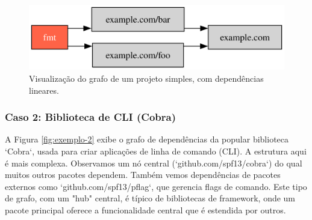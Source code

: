 \documentclass[12pt]{article}
\begin{document}
\begin{figure}[htbp]
\centering
\includegraphics[width=.8\textwidth]{examples/example.com.png}
\caption{Visualização do grafo de um projeto simples, com dependências lineares.}
\label{fig:grafoExemplo}
\end{figure}

\FloatBarrier

\subsubsection{Caso 2: Biblioteca de CLI (Cobra)}
A Figura \ref{fig:exemplo-2} exibe o grafo de dependências da popular biblioteca `Cobra`, usada para criar aplicações de linha de comando (CLI). A estrutura aqui é mais complexa. Observamos um nó central (`github.com/spf13/cobra`) do qual muitos outros pacotes dependem. Também vemos dependências de pacotes externos como `github.com/spf13/pflag`, que gerencia flags de comando. Este tipo de grafo, com um "hub" central, é típico de bibliotecas de framework, onde um pacote principal oferece a funcionalidade central que é estendida por outros.
\end{document}
